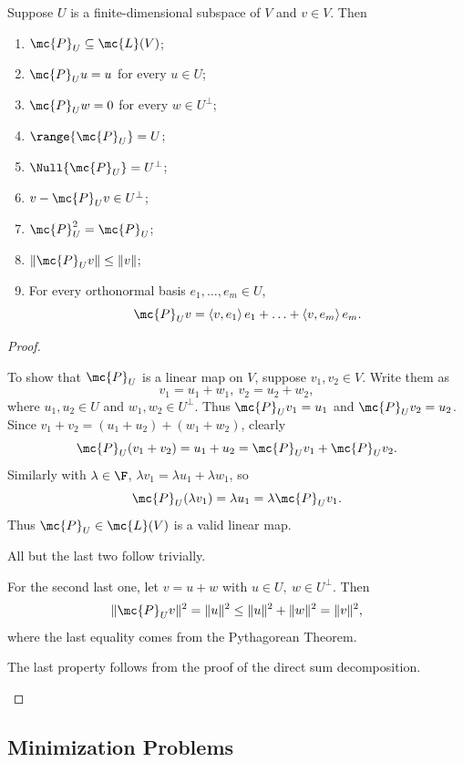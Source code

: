 \documentclass[math0540-lecture-notes.tex]{subfiles}
\begin{document}
\begin{proposition}{}
  Suppose $U$ is a finite-dimensional subspace of $V$ and $v\in V$. Then
  \begin{enumerate}
    \item $\mc{P}_U\subseteq \mc{L}(V)$;
    \item $\mc{P}_Uu=u$ for every $u\in U$;
    \item $\mc{P}_Uw=0$ for every $w\in U^{\bot}$;
    \item $\range{\mc{P}_U}=U$;
    \item $\Null{\mc{P}_U}=U^{\bot}$;
    \item $v-\mc{P}_Uv\in U^{\bot}$;
    \item $\mc{P}_U^2=\mc{P}_U$;
    \item $\|\mc{P}_Uv\|\le \|v\|$;
    \item For every orthonormal basis $e_1,\ldots,e_m\in U$, \[
      \mc{P}_Uv=\left<v,e_1 \right>e_1+\ldots+\left<v,e_m \right> e_m 
    .\] 
  \end{enumerate}
\end{proposition}
\begin{proof}[Proof]
  \begin{enumerate}
    To show that $\mc{P}_U$ is a linear map on $V$, suppose $v_1,v_2\in V$. Write them as \[
        v_1=u_1+w_1,\ v_2=u_2+w_2
      ,\] where $u_1,u_2\in U$ and $w_1,w_2\in U^{\bot}$. Thus $\mc{P}_Uv_1=u_1$ and $\mc{P}_Uv_2=u_2$.
      Since $v_1+v_2=(u_1+u_2)+(w_1+w_2)$, clearly \[
        \mc{P}_U(v_1+v_2)=u_1+u_2=\mc{P}_Uv_1+\mc{P}_Uv_2
      .\] Similarly with $\lambda\in \F$, $\lambda v_1=\lambda u_1+\lambda w_1$, so \[
      \mc{P}_U(\lambda v_1)=\lambda u_1=\lambda\mc{P}_Uv_1
      .\] Thus $\mc{P}_U\in \mc{L}(V)$ is a valid linear map.

      All but the last two follow trivially.

      For the second last one, let $v=u+w$ with $u\in U,\ w\in U^{\bot}$. Then \[
        \|\mc{P}_Uv\|^2=\|u\|^2\le \|u\|^2+\|w\|^2=\|v\|^2
      ,\] where the last equality comes from the Pythagorean Theorem.

      The last property follows from the proof of the direct sum decomposition.
    
  \end{enumerate}
\end{proof}

\subsection{Minimization Problems}
\end{document}
